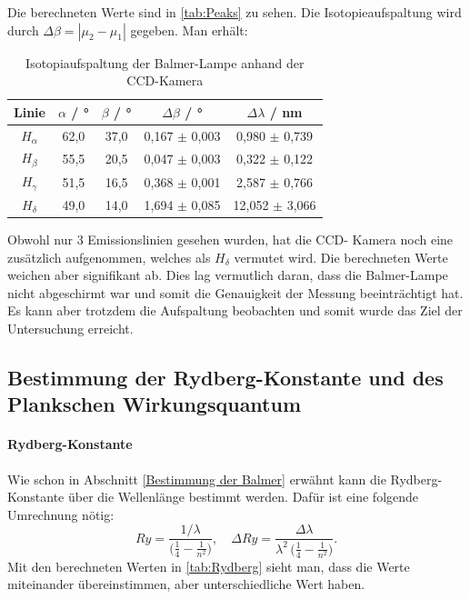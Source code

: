 Die berechneten Werte sind in \cref{tab:Peaks} zu sehen.
Die Isotopieaufspaltung wird durch 
$\Delta\beta = |\mu_2 - \mu_1|$
gegeben. 
Man erhält:
\begin{table}[htbp]
    \centering
    \begin{tabular}{|c|c|c|c|c|}
        Linie & $\alpha$ / ° & $\beta$ / ° & $\Delta\beta$ / ° & $\Delta\lambda$ / nm \\
        \hline
        $H_\alpha$& 62,0 & 37,0 & 0,167 $\pm$ 0,003 & 0,980 $\pm$ 0,739 \\
        $H_\beta$ & 55,5 & 20,5 & 0,047 $\pm$ 0,003 & 0,322 $\pm$ 0,122 \\
        $H_\gamma$ & 51,5 & 16,5 & 0,368 $\pm$ 0,001 & 2,587 $\pm$ 0,766 \\
        $H_\delta$ & 49,0 & 14,0 & 1,694 $\pm$ 0,085 & 12,052 $\pm$ 3,066 \\
    \end{tabular}
    \caption{Isotopiaufspaltung der Balmer-Lampe anhand der CCD-Kamera}
    \label{tab:Isotopiaufspaltung}
\end{table}
Obwohl nur 3 Emissionslinien gesehen wurden, hat die CCD- Kamera noch eine zusätzlich aufgenommen, welches als $H_\delta$ vermutet wird.
Die berechneten Werte weichen aber signifikant ab.
Dies lag vermutlich daran, dass die Balmer-Lampe nicht abgeschirmt war und somit die Genauigkeit der Messung beeinträchtigt hat. 
Es kann aber trotzdem die Aufspaltung beobachten und somit wurde das Ziel der Untersuchung erreicht.

\subsection{Bestimmung der Rydberg-Konstante und des Plankschen Wirkungsquantum}
\paragraph{Rydberg-Konstante} \label{Rydberg-konst}
Wie schon in Abschnitt \ref{Bestimmung der Balmer} erwähnt kann die Rydberg-Konstante über die Wellenlänge bestimmt werden.
Dafür ist eine folgende Umrechnung nötig:
\begin{equation}
  Ry
  = \frac{1/\lambda}{\bigl(\tfrac{1}{4} - \tfrac{1}{n^{2}}\bigr)},
  \quad
  \Delta Ry
  = \frac{\Delta\lambda}{\lambda^{2}\,\bigl(\tfrac{1}{4} - \tfrac{1}{n^{2}}\bigr)}.
\end{equation}
Mit den berechneten Werten in \cref{tab:Rydberg} sieht man, dass die Werte miteinander übereinstimmen, aber unterschiedliche Wert haben. 

